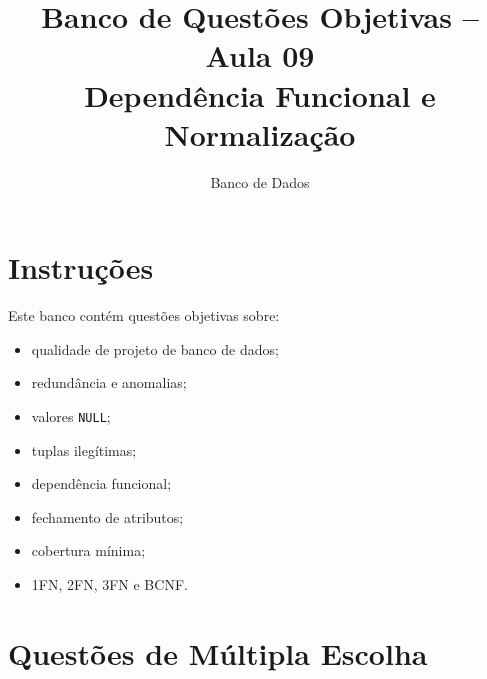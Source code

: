 \documentclass[12pt,a4paper]{article}
\title{Banco de Questões Objetivas -- Aula 09\\Dependência Funcional e Normalização}
\author{Banco de Dados}
\date{}
\begin{document}
\maketitle

\section*{Instruções}

Este banco contém questões objetivas sobre:
\begin{itemize}
    \item qualidade de projeto de banco de dados;
    \item redundância e anomalias;
    \item valores \texttt{NULL};
    \item tuplas ilegítimas;
    \item dependência funcional;
    \item fechamento de atributos;
    \item cobertura mínima;
    \item 1FN, 2FN, 3FN e BCNF.
\end{itemize}

\section{Questões de Múltipla Escolha}
\end{document}
